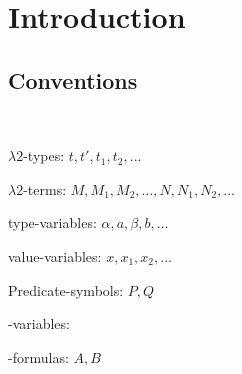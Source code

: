 \section{Introduction}

\subsection{Conventions}
~

$\lambda2$-types: $t, t', t_1, t_2, \dots$

$\lambda2$-terms: $M, M_1, M_2,\dots,N,N_1,N_2,\dots$

type-variables: $\alpha, a, \beta, b, \dots$

value-variables: $x, x_1 , x_2 ,\dots$

Predicate-symbols: $P,Q$

\SysP-variables:

\SysP-formulas: $A, B$

